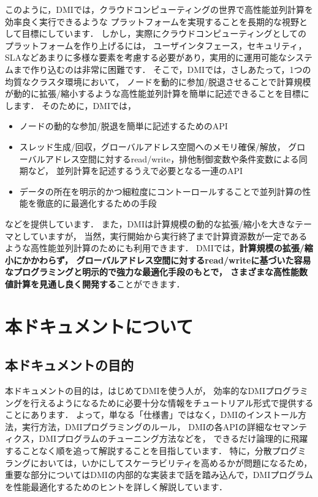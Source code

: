\documentclass[report,12pt]{jsbook}
\begin{document}
このように，DMIでは，クラウドコンピューティングの世界で高性能並列計算を効率良く実行できるような
プラットフォームを実現することを長期的な視野として目標にしています．
しかし，実際にクラウドコンピューティングとしてのプラットフォームを作り上げるには，
ユーザインタフェース，セキュリティ，SLAなどあまりに多様な要素を考慮する必要があり，実用的に運用可能なシステムまで作り込むのは非常に困難です．
そこで，DMIでは，さしあたって，1つの均質なクラスタ環境において，
ノードを動的に参加/脱退させることで計算規模が動的に拡張/縮小するような高性能並列計算を簡単に記述できることを目標にします．
そのために，DMIでは，
\begin{itemize}
\item ノードの動的な参加/脱退を簡単に記述するためのAPI
\item スレッド生成/回収，グローバルアドレス空間へのメモリ確保/解放，
  グローバルアドレス空間に対するread/write，排他制御変数や条件変数による同期など，
  並列計算を記述するうえで必要となる一連のAPI
\item データの所在を明示的かつ細粒度にコントーロールすることで並列計算の性能を徹底的に最適化するための手段
\end{itemize}
などを提供しています．
また，DMIは計算規模の動的な拡張/縮小を大きなテーマとしていますが，
当然，実行開始から実行終了まで計算資源数が一定であるような高性能並列計算のためにも利用できます．
DMIでは，\textbf{計算規模の拡張/縮小にかかわらず，
グローバルアドレス空間に対するread/writeに基づいた容易なプログラミングと明示的で強力な最適化手段のもとで，
さまざまな高性能数値計算を見通し良く開発する}ことができます．


\section{本ドキュメントについて}

\subsection{本ドキュメントの目的}

本ドキュメントの目的は，はじめてDMIを使う人が，
効率的なDMIプログラミングを行えるようになるために必要十分な情報をチュートリアル形式で提供することにあります．
よって，単なる「仕様書」ではなく，DMIのインストール方法，実行方法，DMIプログラミングのルール，
DMIの各APIの詳細なセマンティクス，DMIプログラムのチューニング方法などを，
できるだけ論理的に飛躍することなく順を追って解説することを目指しています．
特に，分散プログミラングにおいては，いかにしてスケーラビリティを高めるかが問題になるため，
重要な部分についてはDMIの内部的な実装まで話を踏み込んで，DMIプログラムを性能最適化するためのヒントを詳しく解説しています．
\end{document}
